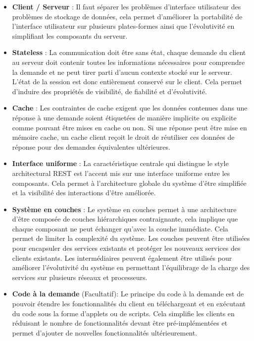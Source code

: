 \begin{itemize}

    \item \textbf{Client / Serveur} :
    \newline
    Il faut séparer les problèmes d’interface utilisateur des problèmes de stockage de données, cela permet d'améliorer la portabilité de l'interface utilisateur sur plusieurs plates-formes ainsi que l’évolutivité en simplifiant les composants du serveur.

    \item \textbf{Stateless} :
    \newline
    La communication doit être sans état, chaque demande du client au serveur doit contenir toutes les informations nécessaires pour comprendre la demande et ne peut tirer parti d'aucun contexte stocké sur le serveur. L'état de la session est donc entièrement conservé sur le client. Cela permet d'induire des propriétés de visibilité, de fiabilité et d'évolutivité.

    \item \textbf{Cache} :
    \newline
    Les contraintes de cache exigent que les données contenues dans une réponse à une demande soient étiquetées de manière implicite ou explicite comme pouvant être mises en cache ou non. Si une réponse peut être mise en mémoire cache, un cache client reçoit le droit de réutiliser ces données de réponse pour des demandes équivalentes ultérieures.

    \item \textbf{Interface uniforme} :
    \newline
    La caractéristique centrale qui distingue le style architectural REST est l'accent mis sur une interface uniforme entre les composants. Cela permet à l'architecture globale du système d'être simplifiée et la visibilité des interactions d'être améliorée.

    \item \textbf{Système en couches} :
    \newline
    Le système en couches permet à une architecture d'être composée de couches hiérarchiques contraignante, cela implique que chaque composant ne peut échanger qu'avec la couche immédiate. Cela permet de limiter la complexité du système. Les couches peuvent être utilisées pour encapsuler des services existants et protéger les nouveaux services des clients existants. Les intermédiaires peuvent également être utilisés pour améliorer l'évolutivité du système en permettant l'équilibrage de la charge des services sur plusieurs réseaux et processeurs.

    \item \textbf{Code à la demande} (Facultatif):
    \newline
    Le principe du code à la demande est de pouvoir étendre les fonctionnalités du client en téléchargeant et en exécutant du code sous la forme d'applets ou de scripts. Cela simplifie les clients en réduisant le nombre de fonctionnalités devant être pré-implémentées et permet d'ajouter de nouvelles fonctionnalités ultérieurement.

\end{itemize}

